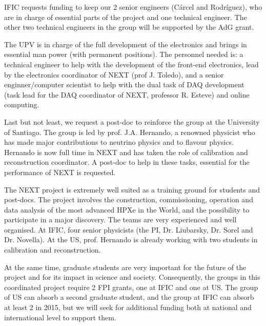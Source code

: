 IFIC  requests funding to keep our 2 senior engineers (C\'arcel and Rodr\'iguez), who are in charge of essential parts of the project and one technical engineer. The other two technical engineers in the group will be supported by the AdG grant.  

The UPV is in charge of the full development of the electronics and brings in essential man power (with permanent positions). The personnel needed is: a technical engineer to help with the development of the front-end electronics, lead by the electronics coordinator of NEXT (prof J. Toledo), and a senior enginner/computer scientist to help with the dual task of DAQ development (task lead for the DAQ coordinator of NEXT, professor R. Esteve) and online computing.  

Last but not least, we request a post-doc to reinforce the group at the University of Santiago. The group is led by prof. J.A. Hernando, a renowned physicist who has made major contributions to neutrino physics and to flavour physics. Hernando is now full time in NEXT and has taken the role of calibration and reconstruction coordinator. A post-doc to help in these tasks, essential for the performance of NEXT is requested. 

The NEXT project is extremely well suited as a training ground for students and post-docs. The project involves the construction, commissioning, operation and data analysis of the most advanced HPXe in the World, and the possibility to participate in a major discovery. The teams are very experienced and well organised. At IFIC, four senior physicists (the PI, Dr. Liubarsky, Dr. Sorel and Dr. Novella). At the US, prof. Hernando is already working with two students in calibration and reconstruction.

At the same time, graduate students are very important for the future of the project and for its impact in science and society. Consequently, the groups in this coordinated project require 2 FPI grants, one at IFIC and one at US. The group of US can absorb a second graduate student, and the group at IFIC can absorb at least 2 in 2015, but we will seek for additional funding both at national and international level to support them. 

